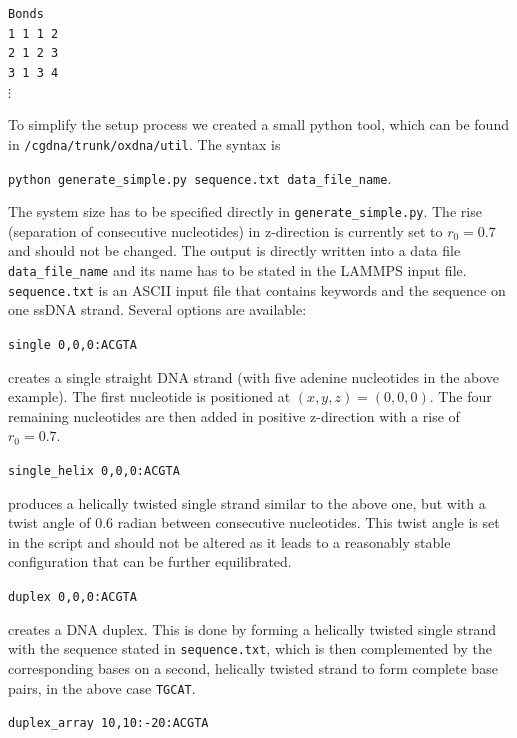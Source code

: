 \documentclass[12pt,onecolumn]{article}
\begin{document}
\smallskip
\texttt{Bonds\\
\vspace*{0.3cm}
1       1       1       2\\
2       1       2       3\\
3       1       3       4\\
$\vdots$
}
\smallskip

\noindent To simplify the setup process we created a small python tool, which can be found
in \newline \texttt{/cgdna/trunk/oxdna/util}. The syntax is

\smallskip
\texttt{python generate\_simple.py sequence.txt data\_file\_name}. 
\smallskip

\noindent The system size has to be specified directly in \texttt{generate\_simple.py}. 
The rise (separation of consecutive nucleotides) in z-direction is currently set to 
$r_0=0.7$ and should not be changed.
The output is directly written into a data file \texttt{data\_file\_name} and its name has to be stated in 
the LAMMPS input file. \texttt{sequence.txt} is an ASCII input file that contains 
keywords and the sequence on one ssDNA strand. Several options are available:

\smallskip
\texttt{single 0,0,0:ACGTA} 
\smallskip

\noindent creates a single straight DNA strand (with five adenine nucleotides in the above example). 
The first nucleotide is
positioned at $(x,y,z)=(0,0,0)$. The four remaining nucleotides are then added in positive
z-direction with a rise of $r_0=0.7$. 

\smallskip
\texttt{single\_helix 0,0,0:ACGTA}
\smallskip

\noindent produces a helically twisted single strand similar to the above one, but with a twist angle of $0.6$
radian between consecutive nucleotides. This twist angle is set in the script and should not be altered as it leads to a reasonably 
stable configuration that can be further equilibrated.

\smallskip
 \texttt{duplex 0,0,0:ACGTA}
\smallskip

\noindent creates a DNA duplex. This is done by forming a helically twisted single strand with the sequence stated
in \texttt{sequence.txt}, which is then complemented by the corresponding bases on a second, helically twisted 
strand to form complete base pairs, in the above case \texttt{TGCAT}.
 
\smallskip
\texttt{duplex\_array 10,10:-20:ACGTA}
\smallskip
\end{document}
